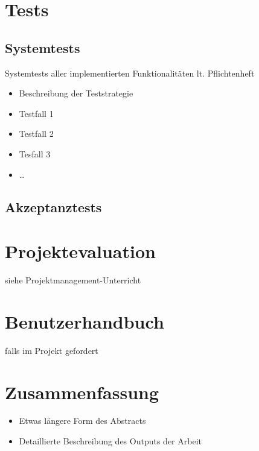 \chapter{Tests}

\section{Systemtests} 
Systemtests aller implementierten Funktionalitäten lt. Pflichtenheft
\begin{itemize}
	\item Beschreibung der Teststrategie
	\item Testfall 1
	\item Testfall 2
	\item Tesfall 3
	\item …
\end{itemize}

\section{Akzeptanztests}

\chapter{Projektevaluation}
siehe Projektmanagement-Unterricht

\chapter{Benutzerhandbuch} 
falls im Projekt gefordert

\chapter{Zusammenfassung}
\begin{itemize}
	\item Etwas längere Form des Abstracts
	\item Detaillierte Beschreibung des Outputs der Arbeit
\end{itemize}